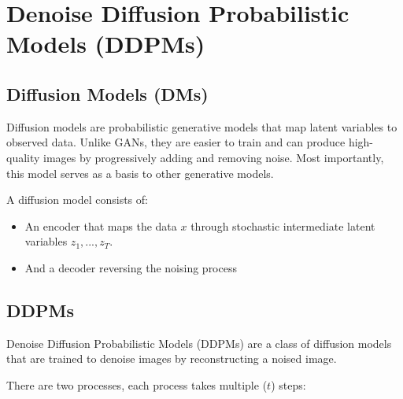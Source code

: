 \section{Denoise Diffusion Probabilistic Models (DDPMs)}


\subsection{Diffusion Models (DMs)}
\label{subsec:diffusion_models}

Diffusion models are probabilistic generative models that map latent variables to observed data. Unlike GANs, they are easier to train and can produce high-quality images by progressively adding and removing noise. Most importantly, this model serves as a basis to other generative models.

A diffusion model consists of:

\begin{itemize}
    \item An encoder that maps the data $x$ through stochastic intermediate latent variables $z_1, ..., z_T$.
    \item And a decoder reversing the noising process
\end{itemize}








\subsection{DDPMs}
\label{sec:ddpm}

Denoise Diffusion Probabilistic Models (DDPMs) \cite{ddpm} are a class of diffusion models that are trained to denoise images by reconstructing a noised image. 

There are two processes, each process takes multiple ($t$) steps:


